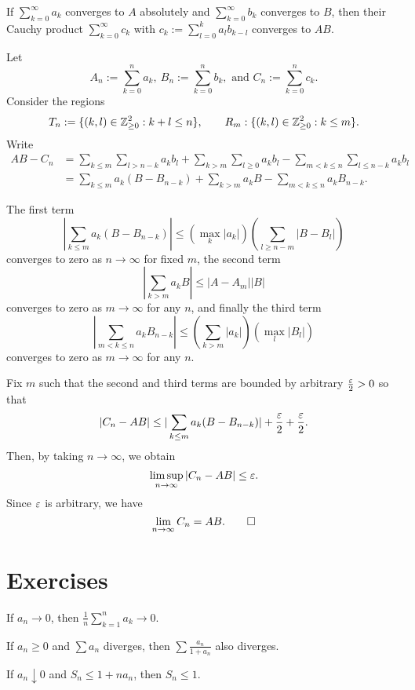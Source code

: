 \documentclass{../note}
\begin{document}
\begin{prb}
If $\sum_{k=0}^\infty a_k$ converges to $A$ absolutely and $\sum_{k=0}^\infty b_k$ converges to $B$, then their Cauchy product $\sum_{k=0}^\infty c_k$ with $c_k:=\sum_{l=0}^ka_lb_{k-l}$ converges to $AB$.
\end{prb}
\begin{pf}
Let
\[A_n:=\sum_{k=0}^na_k,\ B_n:=\sum_{k=0}^nb_k, \text{ and } C_n:=\sum_{k=0}^nc_k.\]
Consider the regions
\[T_n:=\{(k,l)\in\mathbb{Z}_{\ge0}^2:k+l\le n\},\qquad R_m:\{(k,l)\in\mathbb{Z}_{\ge0}^2:k\le m\}.\]
Write
\begin{align*}
AB-C_n&=\sum_{k\le m}\sum_{l>n-k}a_kb_l+\sum_{k>m}\sum_{l\ge0}a_kb_l-\sum_{m<k\le n}\sum_{l\le n-k}a_kb_l\\
&=\sum_{k\le m}a_k(B-B_{n-k})+\sum_{k>m}a_kB-\sum_{m<k\le n}a_kB_{n-k}.
\end{align*}

The first term
\[|\sum_{k\le m}a_k(B-B_{n-k})|\le(\max_k|a_k|)(\sum_{l\ge n-m}|B-B_l|)\]
converges to zero as $n\to\infty$ for fixed $m$, the second term
\[|\sum_{k>m}a_kB|\le|A-A_m||B|\]
converges to zero as $m\to\infty$ for any $n$, and finally the third term
\[|\sum_{m<k\le n}a_kB_{n-k}|\le(\sum_{k>m}|a_k|)(\max_l|B_l|)\]
converges to zero as $m\to\infty$ for any $n$.

Fix $m$ such that the second and third terms are bounded by arbitrary $\frac{\varepsilon}2>0$ so that
\[|C_n-AB|\le|\sum_{k\le m}a_k(B-B_{n-k})|+\frac{\varepsilon}2+\frac{\varepsilon}2.\]
Then, by taking $n\to\infty$, we obtain
\[\limsup_{n\to\infty}|C_n-AB|\le\varepsilon.\] 
Since $\varepsilon$ is arbitrary, we have
\[\lim_{n\to\infty}C_n=AB.\qedhere\]
\end{pf}



\section*{Exercises}

\begin{prb}
If $a_n\to0$, then $\frac1n\sum_{k=1}^na_k\to0$.
\end{prb}

\begin{prb}
If $a_n\ge0$ and $\sum a_n$ diverges, then $\sum\frac{a_n}{1+a_n}$ also diverges.
\end{prb}

\begin{prb}
If $a_n\downarrow0$ and $S_n\le1+na_n$, then $S_n\le1$.
\end{prb}
\end{document}
